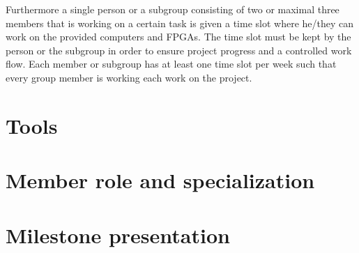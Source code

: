
Furthermore a single person or a subgroup consisting of two or maximal three members that is working on a certain task is given a time slot where he/they can work on the provided computers and FPGAs.
The time slot must be kept by the person or the subgroup in order to ensure project progress and a controlled work flow.
Each member or subgroup has at least one time slot per week such that every group member is working each work on the project.

\section{Tools}

\section{Member role and specialization}

\section{Milestone presentation}
